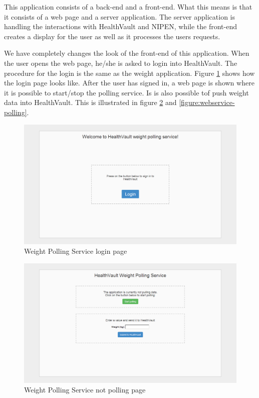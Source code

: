 This application consists of a back-end and a front-end.
What this means is that it consists of a web page and a server application.
The server application is handling the interactions with HealthVault and NIPEN, while the front-end creates a display for the user as well as it processes the users requests.

We have completely changes the look of the front-end of this application.
When the user opens the web page, he/she is asked to login into HealthVault.
The procedure for the login is the same as the weight application.
Figure \ref{figure:webservice-login} shows how the login page looks like.
After the user has signed in, a web page is shown where it is possible to start/stop the polling service.
Is is also possible tof push weight data into HealthVault. 
This is illustrated in figure \ref{figure:webservice-not-polling} and \ref{figure:webservice-polling}.

\begin{figure}[H]
\centering
\includegraphics[scale=0.4]{../Figures/webservice-login.png}
\caption{Weight Polling Service login page}
\label{figure:webservice-login}
\end{figure}

\begin{figure}[H]
\centering
\includegraphics[scale=0.4]{../Figures/webservice-not-polling.png}
\caption{Weight Polling Service not polling page}
\label{figure:webservice-not-polling}
\end{figure}

